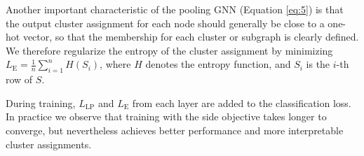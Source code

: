 Another important characteristic of the pooling GNN (Equation \ref{eq:5})  is that the output cluster assignment for each node should generally be close to a one-hot vector, so that the membership for each cluster or subgraph is clearly defined. %
We therefore regularize the entropy of the cluster assignment by minimizing $L_{\text{E}} = \frac{1}{n} \sum_{i=1}^n H(S_i)$, where $H$ denotes the entropy function, and $S_i$ is the $i$-th row of $S$.

During training, $L_{\text{LP}}$ and $L_{\text{E}}$ from each layer are added to the classification loss.
In practice we observe that training with the side objective takes longer to converge, but nevertheless achieves better performance and more interpretable cluster assignments.

